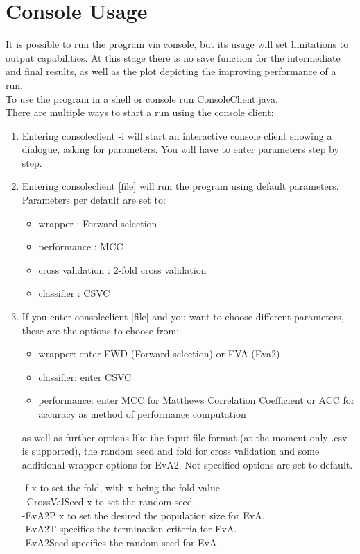 \documentclass[headsepline,12pt,a4paper]{scrartcl}
\begin{document}
\section{Console Usage}
It is possible to run the program via console, but its usage will set limitations to output capabilities. At this stage there is no save function for the intermediate and final results, as well as the plot depicting the improving performance of a run.\\

To use the program in a shell or console run ConsoleClient.java. \\
There are multiple ways to start a run using the console client:
\begin{enumerate}
\item 
Entering consoleclient -i will start an interactive console client showing a dialogue, asking for parameters. You will have to enter parameters step by step.
\item 
Entering consoleclient [file] will run the program using default parameters.\\
Parameters per default are set to:
\begin{itemize}
\item wrapper : Forward selection
\item performance : MCC
\item cross validation : 2-fold cross validation
\item classifier : CSVC
\end{itemize}
\item 
If you enter consoleclient [file] and you want to choose different
parameters, these are the options to choose from:
\begin{itemize}
\item wrapper:
enter FWD (Forward selection) or EVA (Eva2)
\item classifier:
enter CSVC
\item performance:
enter MCC for Matthews Correlation Coefficient or ACC for accuracy as method of performance computation
\end{itemize}

as well as further options like the input file format (at the moment  only
.csv is supported), the random seed and fold for cross validation and some additional
wrapper options for EvA2. Not specified options are set to default.\\ \smallskip

-f x to set the fold, with x being the fold value\\
--CrossValSeed x to set the random seed.\\
-EvA2P x  to set the desired the population size for EvA.\\
-EvA2T specifies the termination criteria for EvA.\\
-EvA2Seed specifies the random seed for EvA.\\ 
\end{enumerate}
\end{document}
